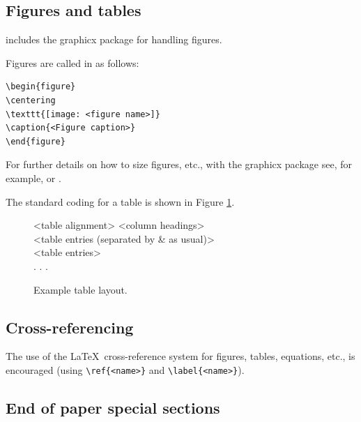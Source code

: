 \documentclass[Afour,sageh,times]{includes/tex/sagej}
\begin{document}
\subsection{Figures and tables}

\textsf{\journalclass} includes the \textsf{graphicx} package for
handling figures.

Figures are called in as follows:

\begin{verbatim}
\begin{figure}
\centering
\texttt{[image: <figure name>]}
\caption{<Figure caption>}
\end{figure}
\end{verbatim}

For further details on how to size figures, etc., with the
\textsf{graphicx} package see, for example, \cite{R1} or \cite{R3}.

The standard coding for a table is shown in Figure \ref{F2}.

\begin{figure}
  \setlength{\fboxsep}{0pt}%
  \setlength{\fboxrule}{0pt}%
  \begin{center}
  \begin{boxedverbatim}
  \begin{table}
  \small\sf\centering
  \caption{<Table caption.>}
  \begin{tabular}{<table alignment>}
  \toprule
  <column headings>\\
  \midrule
  <table entries
  (separated by & as usual)>\\
  <table entries>\\
  .
  .
  .\\
  \bottomrule
  \end{tabular}
  \end{table}
  \end{boxedverbatim}
  \end{center}
  \caption{Example table layout.\label{F2}}
\end{figure}

\subsection{Cross-referencing}

The use of the \LaTeX~cross-reference system for figures, tables,
equations, etc., is encouraged (using \verb"\ref{<name>}" and
\verb"\label{<name>}").

\subsection{End of paper special sections}
\end{document}
